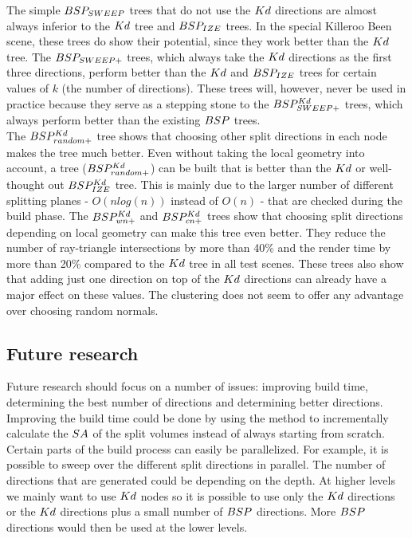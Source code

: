 The simple $BSP_{SWEEP}$ trees that do not use the $Kd$ directions are almost  always inferior to the $Kd$ tree and $BSP_{IZE}$ trees.
In the special Killeroo Been scene, these trees do show their potential, since they work better than the $Kd$ tree.
The $BSP_{SWEEP+}$ trees, which always take the $Kd$ directions as the first three directions, perform better than the $Kd$ and $BSP_{IZE}$ trees for certain values of $k$ (the number of directions).
These trees will, however, never be used in practice because they serve as a stepping stone to the $BSP^{Kd}_{SWEEP+}$ trees, which always perform better than the existing $BSP$ trees. \\

The $BSP^{Kd}_{random+}$ tree shows that choosing other split directions in each node makes the tree much better.
Even without taking the local geometry into account, a tree ($BSP^{Kd}_{random+}$) can be built that is better than the $Kd$ or well-thought out $BSP^{Kd}_{IZE}$ tree.
This is mainly due to the larger number of different splitting planes - $O(nlog (n))$ instead of $O (n)$ - that are checked during the build phase.
The $BSP^{Kd}_{wn+}$ and $BSP^{Kd}_{cn+}$ trees show that choosing split directions depending on local geometry can make this tree even better.
They reduce the number of ray-triangle intersections by more than 40\% and the render time by more than 20\% compared to the $Kd$ tree in all test scenes.
These trees also show that adding just one direction on top of the $Kd$ directions can already have a major effect on these values.
The clustering does not seem to offer any advantage over choosing random normals.

\newpage
\subsection{Future research}
Future research should focus on a number of issues: improving build time, determining the best number of directions and determining better directions.
Improving the build time could be done by using the \authorBudge{} \cite{Budge} method to incrementally calculate the $SA$ of the split volumes instead of always starting from scratch.
Certain parts of the build process can easily be parallelized.
For example, it is possible to sweep over the different split directions in parallel.
The number of directions that are generated could be depending on the depth.
At higher levels we mainly want to use $Kd$ nodes so it is possible to use only the $Kd$ directions or the $Kd$ directions plus a small number of $BSP$ directions. More $BSP$ directions would then be used at the lower levels. \\

